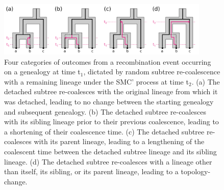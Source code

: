 \documentclass[11pt]{article}
\begin{document}
\begin{figure}[p]
	\centering
	\includegraphics[width=0.9\textwidth]{figures/Fig2-new-recomb-types.pdf}
	\caption{
		Four categories of outcomes from a recombination event occurring on a
		genealogy at time t$_1$, dictated by random subtree re-coalescence with
		a remaining lineage under the SMC' process at time t$_2$. (a) The
		detached subtree re-coalesces with the original lineage from which it
		was detached, leading to no change between the starting genealogy and 
		subsequent genealogy. (b) The detached subtree re-coalesces with its
		sibling lineage prior to their previous coalescence, leading to a shortening
		of their coalescence time. (c) The detached subtree re-coalesces with
		its parent lineage, leading to a lengthening of the coalescent time 
		between the detached subtree lineage and its sibling lineage. (d) The
		detached subtree re-coalesces with a lineage other than itself, its sibling,
		or its parent lineage, leading to a topology-change. 
	}
     \label{fig:figS-recomb-types}
\end{figure}

\end{document}
